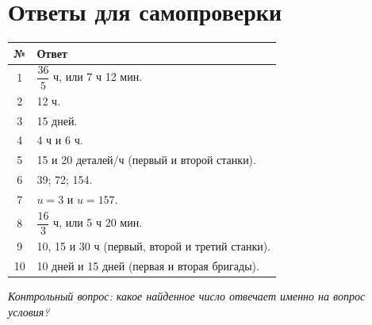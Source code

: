 \documentclass[a4paper,12pt]{article}
\begin{document}
\section*{Ответы для самопроверки}
\renewcommand{\arraystretch}{1.6}
\begin{tabularx}{\linewidth}{@{}cX@{}}
\toprule
\textbf{№} & \textbf{Ответ} \\
\midrule
1 & \(\dfrac{36}{5}\) ч, или 7 ч 12 мин.\\
2 & 12 ч.\\
3 & 15 дней.\\
4 & 4 ч и 6 ч.\\
5 & 15 и 20 деталей/ч (первый и второй станки).\\
6 & 39; 72; 154.\\
7 & \(u=3\) и \(u=157\).\\
8 & \(\dfrac{16}{3}\) ч, или 5 ч 20 мин.\\
9 & 10, 15 и 30 ч (первый, второй и третий станки).\\
10 & 10 дней и 15 дней (первая и вторая бригады).\\
\bottomrule
\end{tabularx}
\vspace{8mm}
\textit{Контрольный вопрос: какое найденное число отвечает именно на вопрос условия?}
\end{document}
